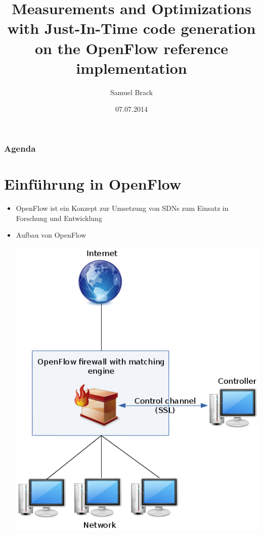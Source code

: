 \documentclass{beamer}
\title[MOJITO]{Measurements and Optimizations with Just-In-Time code generation on the OpenFlow reference implementation}
\author[Samuel Brack]{Samuel Brack}
\institute{Institut für Informatik\\Humboldt-Universität zu Berlin}
\date{07.07.2014}
\begin{document}
\begin{frame}
	\titlepage
\end{frame}

\begin{frame}
	\frametitle{Agenda}
	\tableofcontents
\end{frame}

\section{Einführung in OpenFlow}
\begin{frame}
\begin{itemize}
    \item OpenFlow ist ein Konzept zur Umsetzung von SDNs zum Einsatz in Forschung und Entwicklung
    \item Aufbau von OpenFlow\\
    \begin{center}
    \includegraphics[height=0.8\textheight]{img/openflow_scheme.png}
    \end{center}
\end{itemize}
\end{frame}
\end{document}
